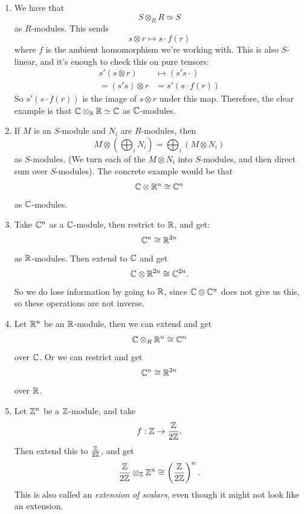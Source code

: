 \documentclass{article}
\begin{document}
\begin{exs}
    \begin{enumerate}
    \item[(1)] We have that \[ S \otimes_{R} R \simeq S\] as $R$-modules. This sends \[ s \otimes r \mapsto s \cdot f(r)\] where $f$ is the ambient homomorphism we're working with. This is also $S$-linear, and it's enough to check this on pure tensors:
    \begin{align*}
        s'(s \otimes r) &\mapsto (s's\cdot)\\
        =(s's)\otimes r &= s'(s \cdot f(r))
    \end{align*}
    So $s'(s \cdot f(r))$ is the image of $s \otimes r$ under this map. Therefore, the clear example is that $\mathbb{C} \otimes_{\mathbb{R}} \mathbb{R} \simeq \mathbb{C}$ as $\mathbb{C}$-modules.

    \item[(2)] If $M$ is an $S$-module and $N_{i}$ are $R$-modules, then \[ M \otimes (\bigoplus_{i} N_{i}) = \bigoplus_{i}(M\otimes N_{i})\] as $S$-modules. (We turn each of the $M \otimes N_{i}$ into $S$-modules, and then direct sum over $S$-modules).\gap
    The concrete example would be that \[ \mathbb{C} \otimes \mathbb{R}^{n} \cong \mathbb{C}^{n}\] as $\mathbb{C}$-modules.

    \item[(3)]Take $\mathbb{C}^{n}$ as a $\mathbb{C}$-module, then restrict to $\mathbb{R}$, and get: \[ \mathbb{C}^{n} \cong \mathbb{R}^{2n}\] as $\mathbb{R}$-modules. Then extend to $\mathbb{C}$ and get \[ \mathbb{C} \otimes \mathbb{R}^{2n} \cong \mathbb{C}^{2n}.\] So we do lose information by going to $\mathbb{R}$, since $\mathbb{C} \otimes \mathbb{C}^{n}$ does not give us this, so these operations are not inverse.

    \item[(4)] Let $\mathbb{R}^{n}$ be an $\mathbb{R}$-module, then we can extend and get \[ \mathbb{C} \otimes_{R} \mathbb{R}^{n} \cong \mathbb{C}^{n} \] over $\mathbb{C}$. Or we can restrict and get \[ \mathbb{C}^{n} \cong \mathbb{R}^{2n}\] over $\mathbb{R}$.
    \item[(5)] Let $\mathbb{Z}^{n}$ be a $\mathbb{Z}$-module, and take \[ f: \mathbb{Z} \to \frac{\mathbb{Z}}{2\mathbb{Z}}.\] Then extend this to $\frac{\mathbb{Z}}{2\mathbb{Z}}$, and get \[ \frac{\mathbb{Z}}{2\mathbb{Z}} \otimes_{\mathbb{Z}} \mathbb{Z}^{n} \cong \left(\frac{\mathbb{Z}}{2\mathbb{Z}}\right)^{n}.\] This is also called an \textit{extension of scalars}, even though it might not look like an extension. \end{enumerate}
\end{exs}
\end{document}
